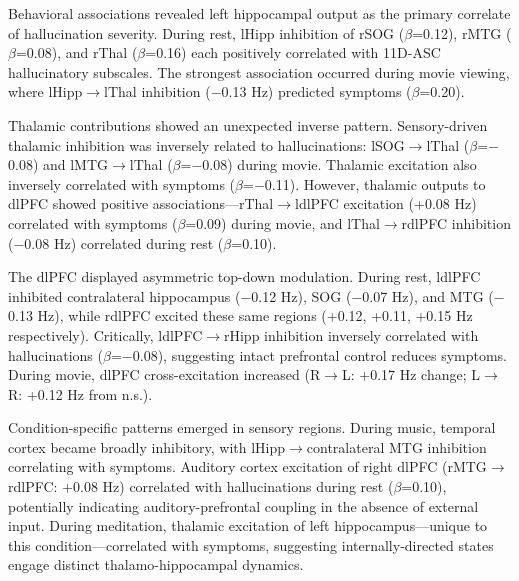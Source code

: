 \documentclass{article}
\begin{document}
Behavioral associations revealed left hippocampal output as the primary correlate of hallucination severity. During rest, lHipp inhibition of rSOG ($\beta$=0.12), rMTG ($\beta$=0.08), and rThal ($\beta$=0.16) each positively correlated with 11D-ASC hallucinatory subscales. The strongest association occurred during movie viewing, where lHipp$\rightarrow$lThal inhibition ($-$0.13 Hz) predicted symptoms ($\beta$=0.20).

Thalamic contributions showed an unexpected inverse pattern. Sensory-driven thalamic inhibition was inversely related to hallucinations: lSOG$\rightarrow$lThal ($\beta$=$-$0.08) and lMTG$\rightarrow$lThal ($\beta$=$-$0.08) during movie. Thalamic excitation also inversely correlated with symptoms ($\beta$=$-$0.11). However, thalamic outputs to dlPFC showed positive associations---rThal$\rightarrow$ldlPFC excitation (+0.08 Hz) correlated with symptoms ($\beta$=0.09) during movie, and lThal$\rightarrow$rdlPFC inhibition ($-$0.08 Hz) correlated during rest ($\beta$=0.10).

The dlPFC displayed asymmetric top-down modulation. During rest, ldlPFC inhibited contralateral hippocampus ($-$0.12 Hz), SOG ($-$0.07 Hz), and MTG ($-$0.13 Hz), while rdlPFC excited these same regions (+0.12, +0.11, +0.15 Hz respectively). Critically, ldlPFC$\rightarrow$rHipp inhibition inversely correlated with hallucinations ($\beta$=$-$0.08), suggesting intact prefrontal control reduces symptoms. During movie, dlPFC cross-excitation increased (R$\rightarrow$L: +0.17 Hz change; L$\rightarrow$R: +0.12 Hz from n.s.).

Condition-specific patterns emerged in sensory regions. During music, temporal cortex became broadly inhibitory, with lHipp$\rightarrow$contralateral MTG inhibition correlating with symptoms. Auditory cortex excitation of right dlPFC (rMTG$\rightarrow$rdlPFC: +0.08 Hz) correlated with hallucinations during rest ($\beta$=0.10), potentially indicating auditory-prefrontal coupling in the absence of external input. During meditation, thalamic excitation of left hippocampus---unique to this condition---correlated with symptoms, suggesting internally-directed states engage distinct thalamo-hippocampal dynamics.
\end{document}
